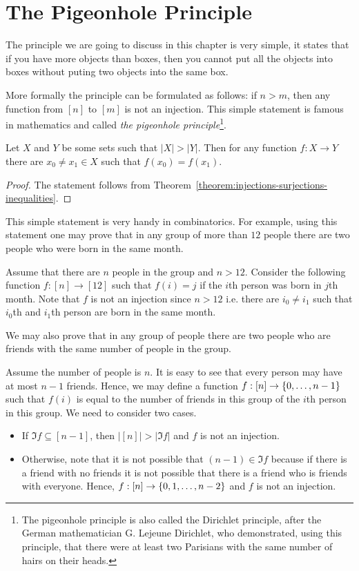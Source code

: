\chapter{The Pigeonhole Principle}

The principle we are going to discuss in this chapter is very simple, it states
that if you have more objects than boxes, then you cannot put all the objects into
boxes without puting two objects into the same box.

More formally the principle can be formulated as follows: if $n > m$, then any
function from $[n]$ to $[m]$ is not an injection. This simple statement is
famous in mathematics and called \emph{the pigeonhole principle}\footnote{%
  The pigeonhole principle is also called the Dirichlet principle, after the
  German mathematician G. Lejeune Dirichlet, who demonstrated, using this
  principle, that there were at least two Parisians with the same number of
  hairs on their heads.
}.

\begin{theorem}
  Let $X$ and $Y$ be some sets such that $|X| > |Y|$. Then for any function
  $f : X \to Y$ there are $x_0 \neq x_1 \in X$ such that $f(x_0) = f(x_1)$.
\end{theorem}
\begin{proof}
  The statement follows from
  Theorem~\ref{theorem:injections-surjections-inequalities}.
\end{proof}

This simple statement is very handy in combinatorics. For example, using this
statement one may prove that in any group of more than $12$ people there are
two people who were born in the same month.

Assume that there are $n$ people in the group and $n > 12$.
Consider the following function $f : [n] \to [12]$ such that $f(i) = j$ if the
$i$th person was born in $j$th month. Note that $f$ is not an injection since
$n > 12$ i.e. there are $i_0 \neq i_1$ such that $i_0$th and $i_1$th person are
born in the same month.

We may also prove that in any group of people there are two people who are
friends with the same number of people in the group.

Assume the number of people is $n$. It is easy to see that every person may
have at most $n - 1$ friends. Hence, we may define a function $f: [n] \to
\set{0, \dots, n - 1}$ such that $f(i)$ is equal to the number of friends in
this group of the $i$th person in this group.
We need to consider two cases.
\begin{itemize}
  \item If $\Im f \subseteq [n - 1]$, then
    $|[n]| > |\Im f|$ and $f$ is not an injection.
  \item Otherwise, note that it is not possible that $(n - 1) \in \Im f$
    because if there is a friend with no friends it is not possible that there
    is a friend who is friends with everyone. Hence,
    $f : [n] \to \set{0, 1, \dots, n - 2}$ and $f$ is not an injection.
\end{itemize}

